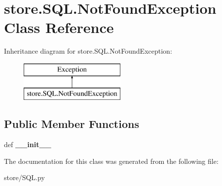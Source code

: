 \hypertarget{classstore_1_1_s_q_l_1_1_not_found_exception}{\section{store.\-S\-Q\-L.\-Not\-Found\-Exception Class Reference}
\label{classstore_1_1_s_q_l_1_1_not_found_exception}
}
Inheritance diagram for store.\-S\-Q\-L.\-Not\-Found\-Exception\-:\begin{figure}[H]
\begin{center}
\leavevmode
\includegraphics[height=2.000000cm]{classstore_1_1_s_q_l_1_1_not_found_exception}
\end{center}
\end{figure}
\subsection*{Public Member Functions}
\begin{DoxyCompactItemize}
\item 
\hypertarget{classstore_1_1_s_q_l_1_1_not_found_exception_a3f7b9b272e5d5fed3cbb2c91a0492070}{def {\bfseries \-\_\-\-\_\-init\-\_\-\-\_\-}}\label{classstore_1_1_s_q_l_1_1_not_found_exception_a3f7b9b272e5d5fed3cbb2c91a0492070}

\end{DoxyCompactItemize}


The documentation for this class was generated from the following file\-:\begin{DoxyCompactItemize}
\item 
store/S\-Q\-L.\-py\end{DoxyCompactItemize}
